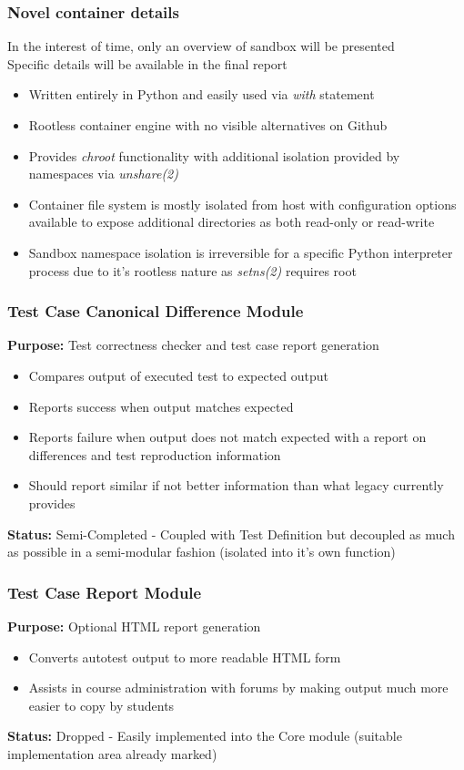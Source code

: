 \documentclass[xcolor, handout]{beamer}
\begin{document}
\begin{frame}
	\frametitle{Novel container details}
	In the interest of time, only an overview of sandbox will be presented\\
	Specific details will be available in the final report
	\begin{itemize}
		\setlength\itemsep{0.75em}
		\item Written entirely in Python and easily used via \textit{with} statement
			\pause
		\item Rootless container engine with no visible alternatives on Github
			\pause
		\item Provides \textit{chroot} functionality with additional isolation provided by namespaces via \textit{unshare(2)}
			\pause
		\item Container file system is mostly isolated from host with configuration options available to expose additional directories as both read-only or read-write
			\pause
		\item Sandbox namespace isolation is irreversible for a specific Python interpreter process due to it's rootless nature as \textit{setns(2)} requires root
	\end{itemize}
\end{frame}

\begin{frame}
	\frametitle{Test Case Canonical Difference Module}
	\textbf{Purpose:} Test correctness checker and test case report generation\\
	\begin{itemize}
		\item Compares output of executed test to expected output
			\pause
		\item Reports success when output matches expected
			\pause
		\item Reports failure when output does not match expected with a report on differences and test reproduction information
			\pause
		\item Should report similar if not better information than what legacy currently provides
			\pause
	\end{itemize}
	\textbf{Status:} Semi-Completed - Coupled with Test Definition but decoupled as much as possible in a semi-modular fashion (isolated into it's own function)
\end{frame}

\begin{frame}
	\frametitle{Test Case Report Module}
	\textbf{Purpose:} Optional HTML report generation\\
	\begin{itemize}
		\item Converts autotest output to more readable HTML form
			\pause
		\item Assists in course administration with forums by making output much more easier to copy by students
			\pause
	\end{itemize}
	\textbf{Status:} Dropped - Easily implemented into the Core module (suitable implementation area already marked)
\end{frame}
\end{document}
